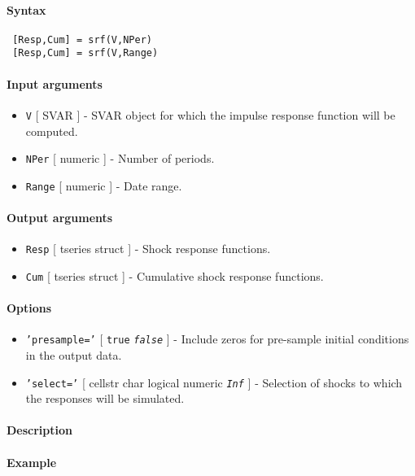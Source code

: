 


	\paragraph{Syntax}
 
 \begin{verbatim}
 [Resp,Cum] = srf(V,NPer)
 [Resp,Cum] = srf(V,Range)
 \end{verbatim}
 
 \paragraph{Input arguments}
 
 \begin{itemize}
 \item
   \texttt{V} {[} SVAR {]} - SVAR object for which the impulse response
   function will be computed.
 \item
   \texttt{NPer} {[} numeric {]} - Number of periods.
 \item
   \texttt{Range} {[} numeric {]} - Date range.
 \end{itemize}
 
 \paragraph{Output arguments}
 
 \begin{itemize}
 \item
   \texttt{Resp} {[} tseries \textbar{} struct {]} - Shock response
   functions.
 \item
   \texttt{Cum} {[} tseries \textbar{} struct {]} - Cumulative shock
   response functions.
 \end{itemize}
 
 \paragraph{Options}
 
 \begin{itemize}
 \item
   \texttt{'presample='} {[} \texttt{true} \textbar{}
   \emph{\texttt{false}} {]} - Include zeros for pre-sample initial
   conditions in the output data.
 \item
   \texttt{'select='} {[} cellstr \textbar{} char \textbar{} logical
   \textbar{} numeric \textbar{} \emph{\texttt{Inf}} {]} - Selection of
   shocks to which the responses will be simulated.
 \end{itemize}
 
 \paragraph{Description}
 
 \paragraph{Example}


